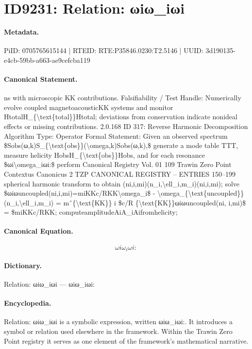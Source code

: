 \section*{ID9231: Relation: ωiω\_iωi}
\paragraph{Metadata.}
PiID: 0705765615144 | RTEID: RTE:P35846.0230:T2.5146 | UUID: 3d190135-e4cb-59bb-a663-ae9cefcba119

\paragraph{Canonical Statement.}
ns with microscopic KK contributions. Falsifiability / Test Handle: Numerically evolve coupled magnetoacousticKK systems and monitor HtotalH\_\{\textbackslash{}text\{total\}\}Htotal; deviations from conservation indicate nonideal effects or missing contributions. 2.0.168 ID 317: Reverse Harmonic Decomposition Algorithm Type: Operator Formal Statement: Given an observed spectrum \$Sobs(ω,k)S\_\{\textbackslash{}text\{obs\}\}(\textbackslash{}omega,k)Sobs(ω,k),\$ generate a mode table TTT, measure helicity HobsH\_\{\textbackslash{}text\{obs\}\}Hobs, and for each resonance \$ωi\textbackslash{}omega\_iωi:\$ perform Canonical Registry Vol. 01 109 Trawin Zero Point Contextus Canonicus 2 TZP CANONICAL REGISTRY – ENTRIES 150–199 spherical harmonic transform to obtain (ni,i,mi)(n\_i,\textbackslash{}ell\_i,m\_i)(ni,i,mi); solve \$ωiωuncoupled(ni,i,mi)=miKKc/RKK\textbackslash{}omega\_i\$ - \textbackslash{}omega\_\{\textbackslash{}text\{uncoupled\}\}(n\_i,\textbackslash{}ell\_i,m\_i) = mˆ\{\textbackslash{}text\{KK\}\} i \$c/R \{\textbackslash{}text\{KK\}\}ωiωuncoupled(ni, i,mi)\$ = \$miKKc/RKK; computeamplitudeAiA\_iAifromhelicity;

\paragraph{Canonical Equation.}
\[
ωi\omega_iωi:
\]

\paragraph{Dictionary.}
Relation: ωiω\_iωi — ωiω\_iωi:

\paragraph{Encyclopedia.}
Relation: ωiω\_iωi is a symbolic expression, written ωiω\_iωi:. It introduces a symbol or relation used elsewhere in the framework. Within the Trawin Zero Point registry it serves as one element of the framework's mathematical narrative.
